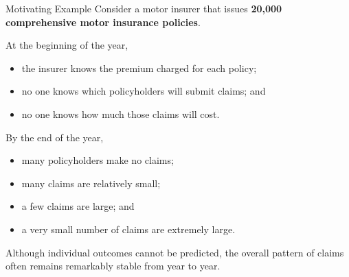 \documentclass[
  ignorenonframetext,
  aspectratio=169,
]{beamer}
\providecommand{\tightlist}{%
  \setlength{\itemsep}{0pt}\setlength{\parskip}{0pt}}
\begin{document}
\begin{frame}{Motivating Example}
\protect{}\label{motivating-example}
Consider a motor insurer that issues \textbf{20,000 comprehensive motor
insurance policies}.

At the beginning of the year,

\begin{itemize}
\tightlist
\item
  the insurer knows the premium charged for each policy;
\item
  no one knows which policyholders will submit claims; and
\item
  no one knows how much those claims will cost.
\end{itemize}

By the end of the year,

\begin{itemize}
\tightlist
\item
  many policyholders make no claims;
\item
  many claims are relatively small;
\item
  a few claims are large; and
\item
  a very small number of claims are extremely large.
\end{itemize}

Although individual outcomes cannot be predicted, the overall pattern of
claims often remains remarkably stable from year to year.
\end{frame}
\end{document}
